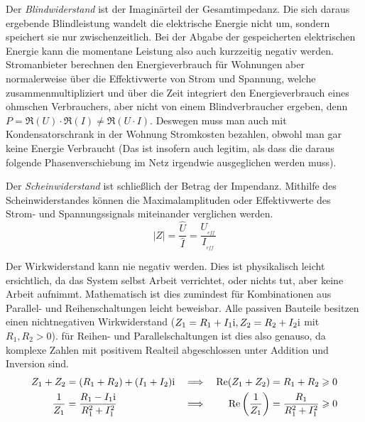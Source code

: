 Der \textit{Blindwiderstand} ist der Imaginärteil der Gesamtimpedanz. Die sich daraus 
ergebende Blindleistung wandelt die elektrische Energie nicht um, sondern speichert sie nur zwischenzeitlich. Bei der Abgabe der gespeicherten elektrischen Energie kann die momentane
Leistung also auch kurzzeitig negativ werden.
Stromanbieter berechnen den Energieverbrauch für Wohnungen aber normalerweise über die Effektivwerte von 
Strom und Spannung, welche zusammenmultipliziert und über die Zeit integriert den Energieverbrauch eines ohmschen Verbrauchers, aber nicht von einem Blindverbraucher ergeben, denn $P = \Re(U) \cdot \Re(I) \neq \Re(U \cdot I)$.
Deswegen muss man auch mit Kondensatorschrank in der Wohnung Stromkosten bezahlen, obwohl man gar keine Energie Verbraucht (Das ist insofern auch legitim, als dass die daraus folgende Phasenverschiebung im Netz irgendwie ausgeglichen werden muss).
%
%

Der \textit{Scheinwiderstand} ist schließlich der Betrag der Impendanz.
Mithilfe des Scheinwiderstandes können die Maximalamplituden oder Effektivwerte des Strom- und Spannungssignals miteinander verglichen werden.
$$|Z| = \frac{\hat{U}}{\hat{I}} = \frac{U__{eff}}{I__{eff}}$$

Der Wirkwiderstand kann nie negativ werden. Dies ist physikalisch leicht ersichtlich, da das System selbst Arbeit verrichtet, oder nichts tut, aber keine Arbeit aufnimmt. Mathematisch ist dies zumindest für Kombinationen aus Parallel- und Reihenschaltungen leicht beweisbar. Alle passiven Bauteile besitzen einen nichtnegativen Wirkwiderstand ($Z_1=R_1+I_1\mathrm{i}, Z_2=R_2+I_2\mathrm{i}$ mit $R_1, R_2 > 0$). für Reihen- und Parallelschaltungen ist dies also genauso, da komplexe Zahlen mit positivem Realteil abgeschlossen unter Addition und Inversion sind.
\begin{align*}
    Z_1 + Z_2 &= (R_1+R_2) + (I_1 + I_2)\mathrm{i} 
    &\implies&& \Re(Z_1 + Z_2) &= R_1+R_2 \geqslant 0\\
    \frac{1}{Z_1} &= \frac{R_1-I_1\mathrm{i}}{R_1^2 + I_1^2}
    &\implies&& \Re\qty(\frac{1}{Z_1}) &= \frac{R_1}{R_1^2 + I_1^2} \geqslant 0
\end{align*}
%
%
%
